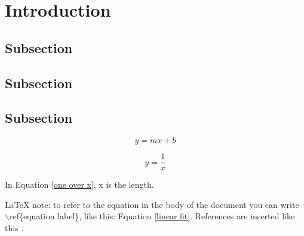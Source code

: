 \documentclass[../main.tex]{subfiles}
\begin{document}
\section{Introduction}

\lipsum[1]

\subsection{Subsection}

\lipsum[2]

\subsection{Subsection}

\lipsum[3]

\subsection{Subsection}

\lipsum[4]

\begin{equation}
\label{linear fit}
   y = m x + b
\end{equation}

\begin{equation}
\label{one over x}
   y = \frac{1}{x}
\end{equation}

In Equation \ref{one over x}, x is the length.

{\LaTeX} note: to refer to the equation in the body of the document you can write $\backslash$ref\{equation label\}, like this: Equation \ref{linear fit}. References are inserted like this \cite{Geankoplis}.
\end{document}
